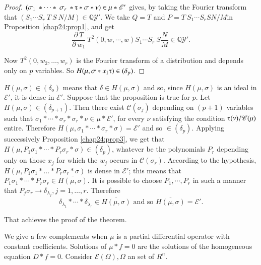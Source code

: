 \begin{proof}%
 $(\sigma_1 ~ * \cdots * ~ \sigma_r ~ * \tauup * \sigma * \nu) \in
 \mu * \mathscr{E}'$ gives, by taking the Fourier transform that
 $(S_1 \cdots S_r ~ T ~ S ~ N/M) \in \mathbb{Q}\mathscr{Y}'$. We take
 $Q = T$ and $P = T ~ S_1 \cdots S_r S N/M$\pageoriginale in
 Proposition \ref{chap24:prop1}, and
 get 
 $$
 \frac{\partial ~ T}{\partial ~ w_1} ~ T^2 (0,w, \cdots, w) S_1
 \cdots S_r ~ S \frac{N}{M} \in \mathbb{Q}\mathscr{Y}'. 
 $$

 Now $T^2 (0, w_2, \ldots, w_r)$ is the Fourier transform of a
 distribution and depends only on $p$ variables. So $H(\mu,\sigma * x_1
 \tauup) \in (\delta_p)$. 
\end{proof}

\setcounter{proofofprop}{1}
\begin{proofofprop}%
 $H(\mu,\sigma) \in (\delta_o)$ means that $\delta \in H(\mu,\sigma)$
 and so, since $H(\mu,\sigma)$ is an ideal in $\mathscr{E}'$, it is
 dense in $\mathscr{E}'$. Suppose that the proposition is true for
 $p$. Let $H(\mu,\sigma) \in (\delta_{p+1})$. Then there exist
 $\mathscr{C}(\sigma_j)$ depending on $(p+1)$ variables such that
 $\sigma_1 * \cdots * \sigma_r * \sigma_r * \nu \in \mu *
 \mathscr{E}'$, for every $\nu$ satisfying the condition $\tauup
 (\nu)/\mathscr{C}(\mu)$ entire. Therefore $H(\mu,\sigma_1 * \cdots *
 \sigma_r * \sigma) = \mathscr{E}'$ and so $\in (\delta_p)$. Applying
 successively Proposition \ref{chap24:prop3}, we get that $H(\mu,P_1 \sigma_1 *
 \cdots * P_r \sigma_r * \sigma) \in (\delta_p)$, whatever be the
 polynomials $P_r$ depending only on those $x_j$ for which the $w_j$
 occurs in $\mathscr{C}(\sigma_r)$. According to the hypothesis,
$H(\mu, P_1 \sigma_1 * \ldots *P_r \sigma_r * \sigma)$ is dense in
 $\mathscr{E}'$; this means that $P_1 \sigma_1 * \cdots * P_r \sigma_r \in
 \overline{H(\mu,\sigma)}$. It is possible to choose $P_1, \cdots,
 P_r$ in such a manner that $P_j \sigma_r \rightarrow
 \delta_{\lambda_j}, j = 1, \ldots, r$. Therefore 
 $$
 \delta_{\lambda_1} * \cdots * \delta_{\lambda_r} \in
 \overline{H(\mu, \sigma)} \text{ and so } \overline{H(\mu,\sigma)} =
 \mathscr{E}'. 
 $$

 That achieves the proof of the theorem.
\end{proofofprop}

We give a few complements when $\mu$ is a partial differential
operator with constant coefficients. Solutions of $\mu * f = 0$ are
the solutions of the homogeneous equation $D * f = 0$. Consider
$\mathscr{E}(\Omega), \Omega$ an set of $R^n$. 

